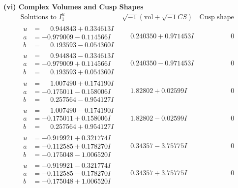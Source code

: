 \documentclass[1p]{elsarticle_modified}
\theoremstyle{definition}
\newcommand{\I}{\sqrt{-1}}
\begin{document}
\newpage\flushleft \textbf{(vi) Complex Volumes and Cusp Shapes}
$$\begin{array}{c|c|c}  
\text{Solutions to }I^u_{1}& \I (\text{vol} + \sqrt{-1}CS) & \text{Cusp shape}\\
 \hline 
\begin{aligned}
u &= \phantom{-}0.944843 + 0.334613 I \\
a &= -0.979009 - 0.114566 I \\
b &= \phantom{-}0.193593 - 0.054360 I\end{aligned}
 & \phantom{-}0.240350 + 0.971453 I & \phantom{-0.000000 } 0 \\ \hline\begin{aligned}
u &= \phantom{-}0.944843 - 0.334613 I \\
a &= -0.979009 + 0.114566 I \\
b &= \phantom{-}0.193593 + 0.054360 I\end{aligned}
 & \phantom{-}0.240350 - 0.971453 I & \phantom{-0.000000 } 0 \\ \hline\begin{aligned}
u &= \phantom{-}1.007490 + 0.174190 I \\
a &= -0.175011 - 0.158006 I \\
b &= \phantom{-}0.257564 - 0.954127 I\end{aligned}
 & \phantom{-}1.82802 + 0.02599 I & \phantom{-0.000000 } 0 \\ \hline\begin{aligned}
u &= \phantom{-}1.007490 - 0.174190 I \\
a &= -0.175011 + 0.158006 I \\
b &= \phantom{-}0.257564 + 0.954127 I\end{aligned}
 & \phantom{-}1.82802 - 0.02599 I & \phantom{-0.000000 } 0 \\ \hline\begin{aligned}
u &= -0.919921 + 0.321774 I \\
a &= -0.112585 + 0.178270 I \\
b &= -0.175048 - 1.006520 I\end{aligned}
 & \phantom{-}0.34357 - 3.75775 I & \phantom{-0.000000 } 0 \\ \hline\begin{aligned}
u &= -0.919921 - 0.321774 I \\
a &= -0.112585 - 0.178270 I \\
b &= -0.175048 + 1.006520 I\end{aligned}
 & \phantom{-}0.34357 + 3.75775 I & \phantom{-0.000000 } 0 \\ \hline\begin{aligned}

\end{aligned}
\end{array}$$
\end{document}
